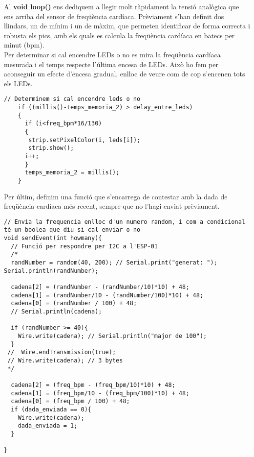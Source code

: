 \begin{spacing}{1.5}
%
\noindent Al \textbf{void loop()} ens dediquem a llegir molt ràpidament la tensió analògica que ens arriba del sensor de freqüència cardíaca. Prèviament s'han definit dos llindars, un de mínim i un de màxim, que permeten identificar de forma correcta i robusta els pics, amb els quals es calcula la freqüència cardíaca en batecs per minut (bpm).\\
\newline Per determinar si cal encendre LEDs o no es mira la freqüència cardíaca mesurada i el temps respecte l'última encesa de LEDs. Això ho fem per aconseguir un efecte d'encesa gradual, enlloc de veure com de cop s'encenen tots els LEDs.
\end{spacing}
\begin{spacing}{1}
\begin{lstlisting}[style=myArduino]
  // Determinem si cal encendre leds o no
    if ((millis()-temps_memoria_2) > delay_entre_leds)
    {
      if (i<freq_bpm*16/130)
      {
       strip.setPixelColor(i, leds[i]);
       strip.show();
      i++;      
      }
      temps_memoria_2 = millis();
    }
\end{lstlisting}
\end{spacing}
\begin{spacing}{1.5}
%
\noindent Per últim, definim una funció que s'encarrega de contestar amb la dada de freqüència cardíaca més recent, sempre que no l'hagi enviat prèviament.
\end{spacing}
\begin{spacing}{1}
\begin{lstlisting}[style=myArduino]
// Envia la frequencia enlloc d'un numero random, i com a condicional té un boolea que diu si cal enviar o no
void sendEvent(int howmany){
  // Funció per respondre per I2C a l'ESP-01
  /*
  randNumber = random(40, 200); // Serial.print("generat: "); Serial.println(randNumber);
  
  cadena[2] = (randNumber - (randNumber/10)*10) + 48; 
  cadena[1] = (randNumber/10 - (randNumber/100)*10) + 48; 
  cadena[0] = (randNumber / 100) + 48; 
  // Serial.println(cadena);

  if (randNumber >= 40){
    Wire.write(cadena); // Serial.println("major de 100");
  }
 //  Wire.endTransmission(true);
 // Wire.write(cadena); // 3 bytes
 */
  
  cadena[2] = (freq_bpm - (freq_bpm/10)*10) + 48; 
  cadena[1] = (freq_bpm/10 - (freq_bpm/100)*10) + 48; 
  cadena[0] = (freq_bpm / 100) + 48; 
  if (dada_enviada == 0){
    Wire.write(cadena);
    dada_enviada = 1;
  }

}
\end{lstlisting}
\end{spacing}
